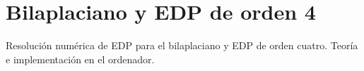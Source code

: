 
\section{Bilaplaciano y EDP de orden 4}

\begin{contenidos}
  Resolución numérica de EDP para el bilaplaciano y EDP de orden
  cuatro. Teoría e implementación en el ordenador.
\end{contenidos}



